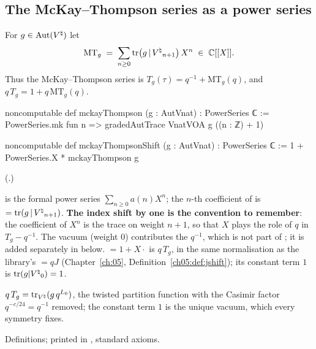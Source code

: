 \subsection{The McKay--Thompson series as a power series}

\begin{definition}\label{ch16:def:mckayThompson}
For $g\in\operatorname{Aut}({V^{\natural}})$ let
\begin{equation*}
  \mathrm{MT}_g \;=\;\sum_{n\ge0}\operatorname{tr}\bigl(g\,|\,{V^{\natural}}_{n+1}\bigr)\,X^n\;\in\;{\mathbb{C}}[[X]] .
\end{equation*}
Thus the McKay--Thompson series is $T_g(\tau)=q^{-1}+\mathrm{MT}_g(q)$, and $q\,T_g=1+q\,\mathrm{MT}_g(q)$.
\end{definition}
\begin{leancode}
noncomputable def mckayThompson (g : AutVnat) : PowerSeries ℂ :=
  PowerSeries.mk fun n => gradedAutTrace VnatVOA g ((n : ℤ) + 1)

noncomputable def mckayThompsonShift (g : AutVnat) : PowerSeries ℂ :=
  1 + PowerSeries.X * mckayThompson g
\end{leancode}
(.)
\begin{dictionary}
 is the formal power series $\sum_{n\ge0}a(n)X^n$; the $n$-th coefficient of
 is  $=\operatorname{tr}(g\,|\,{V^{\natural}}_{n+1})$.  \textbf{The index
shift by one is the convention to remember}: the coefficient of $X^n$ is the trace on weight $n+1$, so that $X$
plays the role of $q$ in $T_g-q^{-1}$.  The vacuum (weight $0$) contributes the $q^{-1}$, which is not part of
; it is added separately in  below.  
$=1+X\cdot$ is $q\,T_g$, in the same normalisation as the library's 
$=qJ$ (Chapter~\ref{ch:05}, Definition~\ref{ch05:def:jshift}); its constant term $1$ is $\operatorname{tr}(g|{V^{\natural}}_0)=1$.
\end{dictionary}
\begin{physics}
$q\,T_g=\operatorname{tr}_{{V^{\natural}}}(g\,q^{L_0})$, the twisted partition function with the Casimir factor $q^{-c/24}=q^{-1}$ removed;
the constant term $1$ is the unique vacuum, which every symmetry fixes.
\end{physics}
\begin{status}
Definitions; printed in , standard axioms.
\end{status}

